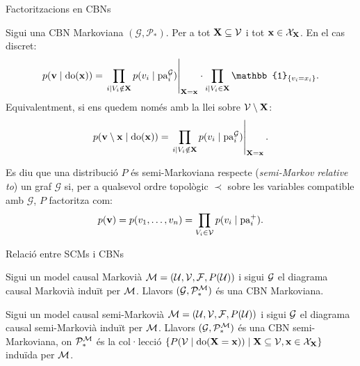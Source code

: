 \documentclass{bestbeamer}
\begin{document}
\begin{frame}[allowframebreaks]{Factoritzacions en CBNs}
\begin{theorem}\label{thm:factoritzaciocbn}
Sigui una CBN Markoviana $(\mathcal{G},\mathcal{P}_*)$. Per a tot $\mathbf{X}\subseteq \mathcal{V}$ i tot $\mathbf{x}\in\mathcal X_{\mathbf X}$. En el cas discret:
\begin{equation*}
    p(\vvv\mid \doop(\xx))
    =
    \left.
    \prod_{i\mid V_i \notin \XX} p(v_i \mid \operatorname{pa}_i^{\mathcal{G}})
    \right|_{\XX=\xx}\cdot\prod_{i\mid V_i \in \XX} \mathbb{1}_{\{v_i=x_i\}}.
\end{equation*}
Equivalentment, si ens quedem només amb la llei sobre $\mathcal{V}\setminus\mathbf{X}$:
\begin{equation*}
    p(\mathbf{v}\setminus\mathbf{x}\mid \operatorname{do}(\mathbf{x}))
    =
    \left.
    \prod_{i\mid V_i \notin \mathbf{X}} p(v_i \mid \operatorname{pa}_i^{\mathcal{G}})
    \right|_{\mathbf{X}=\mathbf{x}}.
\end{equation*}
\end{theorem}
\begin{definition}\label{def:semi_markov_relative}
Es diu que una distribució $P$ és semi-Markoviana respecte (\textit{semi-Markov relative to}) un graf $\mathcal{G}$ si, per a qualsevol ordre topològic $\prec$ sobre les variables compatible amb $\mathcal{G}$, $P$ factoritza com:
\begin{equation*}
    p(\mathbf{v})=p(v_1,\dotsc,v_n) = \prod_{V_i \in \mathcal{V}} p(v_i \mid \operatorname{pa}_i^+).
\end{equation*}
\end{definition}
\end{frame}
\begin{frame}{Relació entre SCMs i CBNs}
\begin{theorem}\label{thm:scm_cbn_markov}
Sigui un model causal Markovià $\mathcal{M}=(\mathcal{U},\mathcal{V},\mathcal{F},P(\mathcal{U}))$ i sigui $\mathcal{G}$ el diagrama causal Markovià induït per $\mathcal{M}$. Llavors $(\mathcal{G},\mathcal{P}^{\mathcal{M}}_*)$ és una CBN Markoviana.
\end{theorem}
\begin{theorem}\label{thm:scm_cbn_semimarkov}
Sigui un model causal semi-Markovià $\mathcal{M}=(\mathcal{U},\mathcal{V},\mathcal{F},P(\mathcal{U}))$ i sigui $\mathcal{G}$ el diagrama causal semi-Markovià induït per $\mathcal{M}$. Llavors $(\mathcal{G},\mathcal{P}^{\mathcal{M}}_*)$ és una CBN semi-Markoviana, on $\mathcal{P}^{\mathcal{M}}_*$ és la col·lecció $\left\{ P(\mathcal{V}\mid \operatorname{do}(\mathbf{X}=\mathbf{x})) \mid \mathbf{X} \subseteq \mathcal{V}, \mathbf{x} \in \mathcal{X}_{\mathbf{X}} \right\}$ induïda per $\mathcal{M}$.
\end{theorem}
\end{frame}
\end{document}
